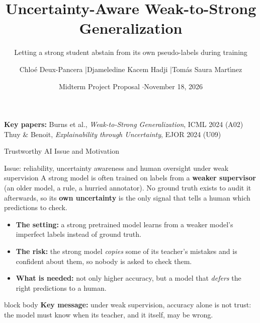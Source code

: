 \documentclass[aspectratio=169,11pt,professionalfonts]{beamer}
\title[TAI Proposal]{Uncertainty-Aware Weak-to-Strong Generalization}
\subtitle{Letting a strong student abstain from its own pseudo-labels during training}
\author[Group 3]{Chlo\'e Deux-Pancera \quad|\quad Djameledine Kacem Hadji \quad|\quad Tom\'as Saura Mart\'{\i}nez}
\institute{Group 3 \quad$\cdot$\quad National Yang Ming Chiao Tung University}
\date{Midterm Project Proposal \quad$\cdot$\quad November 18, 2026}
\newcommand{\keymsg}[1]{%
  \begin{beamercolorbox}[wd=\linewidth,rounded=true,sep=0.6em]{block body}
  \textbf{Key message:} #1
  \end{beamercolorbox}
}
\begin{document}
\begin{frame}[plain]
  \titlepage
  \vspace{-1.2em}
  \begin{center}
    {\small\textbf{Key papers:} Burns et al., \emph{Weak-to-Strong Generalization}, ICML 2024 (A02)\\[0.2em]
    Thuy \& Benoit, \emph{Explainability through Uncertainty}, EJOR 2024 (U09)}
  \end{center}
\end{frame}

\begin{frame}[t]{Trustworthy AI Issue and Motivation}
\begin{block}{Issue: reliability, uncertainty awareness and human oversight under weak supervision}
A strong model is often trained on labels from a \textbf{weaker supervisor} (an older model, a rule, a hurried
annotator). No ground truth exists to audit it afterwards, so its \textbf{own uncertainty} is the only signal
that tells a human which predictions to check.
\end{block}
\vspace{-0.2em}
\begin{itemize}\small
  \item \textbf{The setting:} a strong pretrained model learns from a weaker model's imperfect labels instead of
  ground truth.
  \item \textbf{The risk:} the strong model \emph{copies} some of its teacher's mistakes and is confident about
  them, so nobody is asked to check them.
  \item \textbf{What is needed:} not only higher accuracy, but a model that \emph{defers} the right predictions
  to a human.
\end{itemize}
\vspace{0.2em}
\keymsg{under weak supervision, accuracy alone is not trust: the model must know when its teacher,
and it itself, may be wrong.}
\end{frame}
\end{document}
